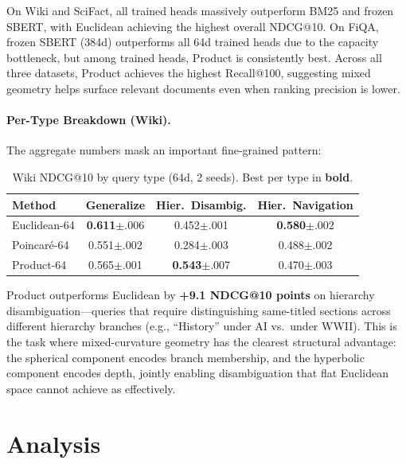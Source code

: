 \documentclass{article}
\begin{document}
On Wiki and SciFact, all trained heads massively outperform BM25 and frozen SBERT, with Euclidean achieving the highest overall NDCG@10. On FiQA, frozen SBERT (384d) outperforms all 64d trained heads due to the capacity bottleneck, but among trained heads, Product is consistently best. Across all three datasets, Product achieves the highest Recall@100, suggesting mixed geometry helps surface relevant documents even when ranking precision is lower.

\paragraph{Per-Type Breakdown (Wiki).} The aggregate numbers mask an important fine-grained pattern:

\begin{table}[h]
\centering
\small
\caption{Wiki NDCG@10 by query type (64d, 2 seeds). Best per type in \textbf{bold}.}
\vspace{0.2cm}
\begin{tabular}{@{}lccc@{}}
\toprule
Method & Generalize & Hier.\ Disambig. & Hier.\ Navigation \\
\midrule
Euclidean-64  & \textbf{0.611}{\scriptsize$\pm$.006} & 0.452{\scriptsize$\pm$.001} & \textbf{0.580}{\scriptsize$\pm$.002} \\
Poincar\'e-64 & 0.551{\scriptsize$\pm$.002} & 0.284{\scriptsize$\pm$.003} & 0.488{\scriptsize$\pm$.002} \\
Product-64    & 0.565{\scriptsize$\pm$.001} & \textbf{0.543}{\scriptsize$\pm$.007} & 0.470{\scriptsize$\pm$.003} \\
\bottomrule
\end{tabular}
\end{table}

Product outperforms Euclidean by \textbf{+9.1 NDCG@10 points} on hierarchy disambiguation---queries that require distinguishing same-titled sections across different hierarchy branches (e.g., ``History'' under AI vs.\ under WWII). This is the task where mixed-curvature geometry has the clearest structural advantage: the spherical component encodes branch membership, and the hyperbolic component encodes depth, jointly enabling disambiguation that flat Euclidean space cannot achieve as effectively.

\section{Analysis}
\label{sec:analysis}
\end{document}
